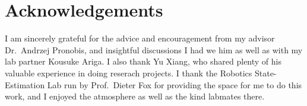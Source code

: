 \documentclass[10pt, titlepage]{article}
\theoremstyle{definition}
\begin{document}
\section{Acknowledgements}\label{section:acknowledgement}

I am sincerely grateful for the advice and encouragement from my advisor Dr.~Andrzej Pronobis, and insightful discussions I had we him as well as with my lab partner Kousuke Ariga. I also thank Yu Xiang, who shared plenty of his valuable experience in doing reserach projects. I thank the Robotics State-Estimation Lab run by Prof.~Dieter Fox for providing the space for me to do this work, and I enjoyed the atmosphere as well as the kind labmates there.


\nocite{*}




\newpage
\appendix
\end{document}
